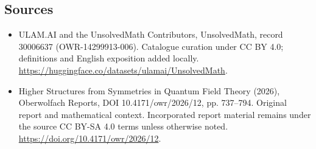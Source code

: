 \documentclass[11pt]{article}
\begin{document}
\subsection{Sources}
\begin{itemize}
\item[\hypertarget{source:30006637:1}{S1}] ULAM.AI and the UnsolvedMath Contributors, UnsolvedMath, record 30006637 (OWR-14299913-006). Catalogue curation under CC BY 4.0; definitions and English exposition added locally.
\url{https://huggingface.co/datasets/ulamai/UnsolvedMath}.
\item[\hypertarget{source:30006637:2}{S2}] Higher Structures from Symmetries in Quantum Field Theory (2026), Oberwolfach Reports, DOI 10.4171/owr/2026/12, pp. 737--794. Original report and mathematical context. Incorporated report material remains under the source CC BY-SA 4.0 terms unless otherwise noted.
\url{https://doi.org/10.4171/owr/2026/12}.
\end{itemize}
\label{end:30006637}
\end{document}
